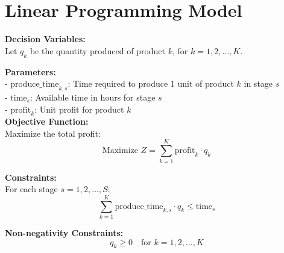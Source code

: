 \documentclass{article}
\begin{document}
\section*{Linear Programming Model}

\textbf{Decision Variables:} \\
Let \( q_k \) be the quantity produced of product \( k \), for \( k = 1, 2, \ldots, K \).

\textbf{Parameters:} \\
- \( \text{produce\_time}_{k,s} \): Time required to produce 1 unit of product \( k \) in stage \( s \) \\
- \( \text{time}_s \): Available time in hours for stage \( s \) \\
- \( \text{profit}_k \): Unit profit for product \( k \) \\

\textbf{Objective Function:} \\
Maximize the total profit:
\[
\text{Maximize } Z = \sum_{k=1}^{K} \text{profit}_k \cdot q_k
\]

\textbf{Constraints:} \\
For each stage \( s = 1, 2, \ldots, S \):
\[
\sum_{k=1}^{K} \text{produce\_time}_{k,s} \cdot q_k \leq \text{time}_s
\]

\textbf{Non-negativity Constraints:} \\
\[
q_k \geq 0 \quad \text{for } k = 1, 2, \ldots, K
\]
\end{document}
